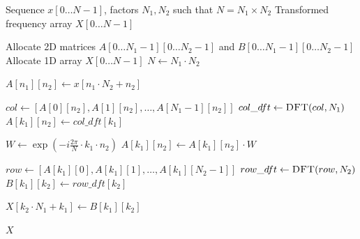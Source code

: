 \documentclass{article}
\begin{document}
\begin{algorithm}[H]
\caption{Mixed-Radix FFT}
\begin{algorithmic}[1]
\Require Sequence $x[0 \dots N-1]$, factors $N_1, N_2$ such that $N = N_1 \times N_2$
\Ensure Transformed frequency array $X[0 \dots N-1]$

    \State Allocate 2D matrices $A[0 \dots N_1-1][0 \dots N_2-1]$ and $B[0 \dots N_1-1][0 \dots N_2-1]$
    \State Allocate 1D array $X[0 \dots N-1]$
    \State $N \gets N_1 \cdot N_2$

            \State $A[n_1][n_2] \gets x[n_1 \cdot N_2 + n_2]$
        \EndFor
    \EndFor

        \State $col \gets [A[0][n_2], A[1][n_2], \dots, A[N_1-1][n_2]]$
        \State $col\_dft \gets \Call{DFT}{col, N_1}$
            \State $A[k_1][n_2] \gets col\_dft[k_1]$
        \EndFor
    \EndFor

            \State $W \gets \exp\left(-i \frac{2\pi}{N} \cdot k_1 \cdot n_2\right)$ 
            \State $A[k_1][n_2] \gets A[k_1][n_2] \cdot W$
        \EndFor
    \EndFor

        \State $row \gets [A[k_1][0], A[k_1][1], \dots, A[k_1][N_2-1]]$
        \State $row\_dft \gets \Call{DFT}{row, N_2}$
            \State $B[k_1][k_2] \gets row\_dft[k_2]$
        \EndFor
    \EndFor

            \State $X[k_2 \cdot N_1 + k_1] \gets B[k_1][k_2]$
        \EndFor
    \EndFor

    \State \Return $X$
\EndProcedure
\end{algorithmic}
\end{algorithm}
\end{document}
